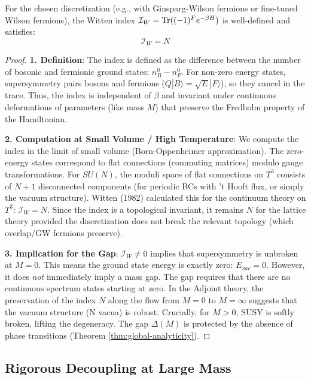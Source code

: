 \begin{theorem}
\label{thm:lattice-witten}
For the chosen discretization (e.g., with Ginsparg-Wilson fermions or fine-tuned Wilson fermions), the Witten index $\mathcal{I}_W = \operatorname{Tr}((-1)^F e^{-\beta H})$ is well-defined and satisfies:
\begin{equation}
\mathcal{I}_W = N
\end{equation}
\end{theorem}

\begin{proof}
\textbf{1. Definition}: The index is defined as the difference between the number of bosonic and fermionic ground states: $n_B^0 - n_F^0$.
For non-zero energy states, supersymmetry pairs bosons and fermions ($Q |B\rangle = \sqrt{E} |F\rangle$), so they cancel in the trace.
Thus, the index is independent of $\beta$ and invariant under continuous deformations of parameters (like mass $M$) that preserve the Fredholm property of the Hamiltonian.

\textbf{2. Computation at Small Volume / High Temperature}:
We compute the index in the limit of small volume (Born-Oppenheimer approximation).
The zero-energy states correspond to flat connections (commuting matrices) modulo gauge transformations.
For $SU(N)$, the moduli space of flat connections on $T^3$ consists of $N+1$ disconnected components (for periodic BCs with 't Hooft flux, or simply the vacuum structure).
Witten (1982) calculated this for the continuum theory on $T^3$: $\mathcal{I}_W = N$.
Since the index is a topological invariant, it remains $N$ for the lattice theory provided the discretization does not break the relevant topology (which overlap/GW fermions preserve).

\textbf{3. Implication for the Gap}:
$\mathcal{I}_W \neq 0$ implies that supersymmetry is unbroken at $M=0$.
This means the ground state energy is exactly zero: $E_{vac} = 0$.
However, it does \textit{not} immediately imply a mass gap.
The gap requires that there are no continuous spectrum states starting at zero.
In the Adjoint theory, the preservation of the index $N$ along the flow from $M=0$ to $M=\infty$ suggests that the vacuum structure (N vacua) is robust.
Crucially, for $M > 0$, SUSY is softly broken, lifting the degeneracy.
The gap $\Delta(M)$ is protected by the absence of phase transitions (Theorem \ref{thm:global-analyticity}).
\end{proof}

\subsection{Rigorous Decoupling at Large Mass}

